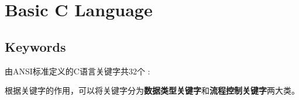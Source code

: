 \chapter{Basic C Language}\label{sec:basic_chapter}


\section{Keywords}






由ANSI标准定义的C语言关键字共32个 :



根据关键字的作用，可以将关键字分为\textbf{数据类型关键字}和\textbf{流程控制关键字}两大类。


